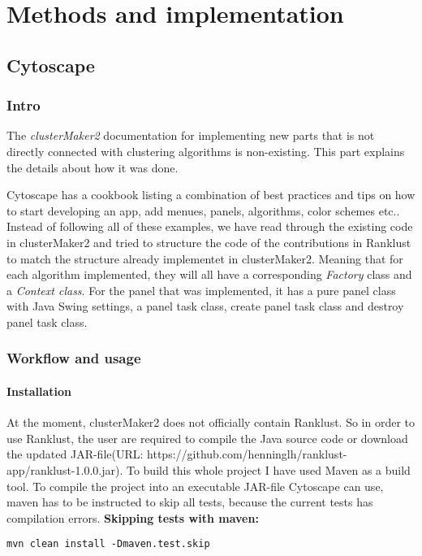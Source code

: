 \part{Methods and implementation}
\label{pa:methimpl}
\chapter{Cytoscape}
\section{Intro}
The \textit{clusterMaker2} documentation for implementing new parts that is not
directly connected with clustering algorithms is non-existing. This part
explains the details about how it was done.

Cytoscape has a cookbook\cite{cytoscape-cookbook} listing a combination of best
practices and tips on how to start developing an app, add menues, panels,
algorithms, color schemes etc.. Instead of following all of these examples, we
have read through the existing code in clusterMaker2\cite{cm2-github} and tried
to structure the code of the contributions in Ranklust to match the structure
already implementet in clusterMaker2. Meaning that for each algorithm
implemented, they will all have a corresponding \textit{Factory} class and a
\textit{Context class}. For the panel that was implemented, it has a pure panel
class with Java Swing\cite{java-swing} settings, a panel task class, create
panel task class and destroy panel task class.

\section{Workflow and usage}
\subsection{Installation}
At the moment, clusterMaker2 does not officially contain Ranklust. So in order
to use Ranklust, the user are required to compile the Java source code or
download the updated JAR-file\cite{jar}(URL:
https://github.com/henninglh/ranklust-app/ranklust-1.0.0.jar). To build this
whole project I have used Maven as a build tool\cite{maven}. To compile the
project into an executable JAR-file Cytoscape can use, \gls{maven} has to be
instructed to skip all tests, because the current tests has compilation errors.
\textbf{Skipping tests with maven:}
\begin{verbatim}
mvn clean install -Dmaven.test.skip
\end{verbatim}

